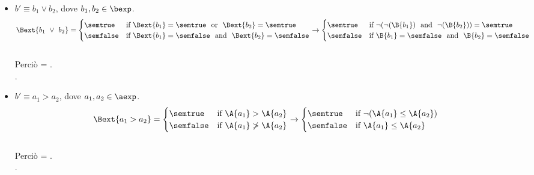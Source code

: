 {\begin{enumerate}[label=(\alph*)]
\begin{itemize}
    \item $ b' \equiv b_1 \lor b_2$, dove $b_1, b_2 \in \bexp$. \\
      \begin{align*}
        \Bext{b_1 \ \lor \ b_2} =
        \begin{cases}
        \semtrue &
        \mbox{if} \ \Bext{b_1} = \semtrue \ \mbox{ or } \ 
              \Bext{b_2} = \semtrue \\
        \semfalse &
        \mbox{if} \ \Bext{b_1} = \semfalse \ \mbox{ and } \ 
              \Bext{b_2} = \semfalse \\
        \end{cases}
        \rightarrow
        \begin{cases}
        \semtrue &
        \mbox{if} \ \lnot (\lnot (\B{b_1}) \ \mbox{ and } \
              \lnot (\B{b_2})) = \semtrue \\
        \semfalse &
        \mbox{if} \ \B{b_1} = \semfalse \ \mbox{ and } \
              \B{b_2} = \semfalse \\
        \end{cases}
      \end{align*} \\
      Perciò \Bext{b_1 \lor b_2} = \B{\lnot (\lnot (\B{b_1}) \land
        \lnot (\B{b_2}))}. \\.

    \item $ b' \equiv a_1 > a_2$, dove $a_1, a_2 \in \aexp$. \\
      \begin{align*} 
       \Bext{a_1 > a_2} = 
        \begin{cases} 
        \semtrue & 
        \mbox{if} \ \A{a_1} > \A{a_2}\\ 
        \semfalse & 
        \mbox{if} \ \A{a_1} \not > \A{a_2}\\
        \end{cases} 
        \rightarrow
        \begin{cases} 
        \semtrue & 
        \mbox{if} \ \lnot (\A{a_1} \leq \A{a_2})\\ 
        \semfalse & 
        \mbox{if} \ \A{a_1} \leq \A{a_2}\\
        \end{cases} 
      \end{align*} \\
      Perciò  = . \\.


\end{itemize}
\end{enumerate}}
